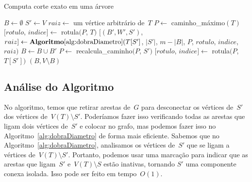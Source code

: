		\bigskip
		\bigskip
		\begin{algorithm}[H]
		\label{alg:corteExato}

			\caption{Computa corte exato em uma árvore}
			$B\gets \emptyset$\;
			$S'\gets V$\;
			$raiz\gets$ um vértice arbitrário de~$T$\;
			$P\gets$ {\sc caminho\_máximo}$(T)$\;
			$[rotulo$, $indice]\gets$ {\sc rotula}$(P$, $T)$
			{
				$[(B',W',S')$, $raiz]\gets
				\mathbf {Algoritmo\ref{alg:dobraDiametro}}(T[S']$,
				$|S'|$, $m-|B|$, $P$, $rotulo$, $indice$, $raiz)$\;
				$B\gets B\cup B'$\;
				$P\gets$ {\sc recalcula\_caminho}$(P$, $S')$\;
				$[rotulo$, $indice]\gets$ {\sc rotula}$(P$, $T[S'])$
			}
			\Return $(B,V\setminus B)$\;

		\end{algorithm}	

		\bigskip
		\bigskip
		\bigskip

		\subsection*{Análise do Algoritmo}


		No algoritmo, temos que retirar arestas de~$G$ para desconectar
		os vértices de~$S'$ dos vértices de~$V(T)\setminus S'$.
		Poderíamos fazer isso verificando todas as arestas que 
		ligam dois vértices de~$S'$ e colocar no grafo, mas podemos
		fazer isso no Algoritmo~\ref{alg:dobraDiametro} de forma 
		mais eficiente. 
		Sabemos que no Algoritmo~\ref{alg:dobraDiametro},
		analisamos os vértices de~$S'$ que se ligam a vértices 
		de~$V(T)\setminus S'$. 
		Portanto, podemos usar uma marcação para indicar que as 
		arestas que ligam~$S'$ e~$V(T)\setminus S$ estão inativas, 
		tornando $S'$ uma componente conexa isolada. 
		Isso pode ser feito em tempo~$O(1)$.

